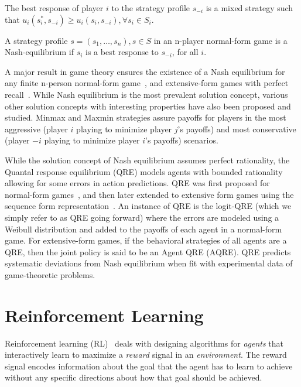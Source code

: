 The best response of player $i$ to the strategy profile $s_{-i}$ is a mixed strategy such that
$u_i(s_i^\ast, s_{-i}) \geq u_i(s_i, s_{-i}), \forall s_i \in S_i$.

\begin{definition}
	A strategy profile $s=(s_1, \dots, s_n), s \in S$ in an n-player normal-form game is a Nash-equilibrium if $s_i$ is a best response to $s_{-i}$, for all
	$i$.
\end{definition}

A major result in game theory ensures the existence of a Nash equilibrium for any finite n-person
normal-form game~\cite{nashEquilibrium1950}, and extensive-form games with perfect
recall~\cite{kuhnExtensive1950}.
While Nash equilibrium is the most prevalent solution concept, various other solution concepts with
interesting properties have also been proposed and studied.
Minmax and Maxmin strategies assure payoffs for players in the most aggressive (player $i$ playing
to minimize player $j$'s payoffs) and most conservative (player $-i$ playing to minimize player
$i$'s payoffs) scenarios.

While the solution concept of Nash equilibrium assumes perfect rationality, the Quantal response
equilibrium (QRE) models agents with bounded rationality allowing for some errors in action
predictions.
QRE was first proposed for normal-form games~\cite{mckelveyQuantal1995}, and then later extended to
extensive form games using the sequence form representation~\cite{mckelveyQuantal1998}.
An instance of QRE is the logit-QRE (which we simply refer to as QRE going forward) where the
errors are modeled using a Weibull distribution and added to the payoffs of each agent in a
normal-form game.
For extensive-form games, if the behavioral strategies of all agents are a QRE, then the joint
policy is said to be an Agent QRE (AQRE).
QRE predicts systematic deviations from Nash equilibrium when fit with experimental data of
game-theoretic problems.

\section{Reinforcement
  Learning}
Reinforcement learning (RL)~\cite{suttonReinforcement2018} deals with designing algorithms for
\textit{agents} that interactively learn to maximize a \textit{reward} signal in an
\textit{environment}.
The reward signal encodes information about the goal that the agent has to learn to achieve without
any specific directions about how that goal should be achieved.

